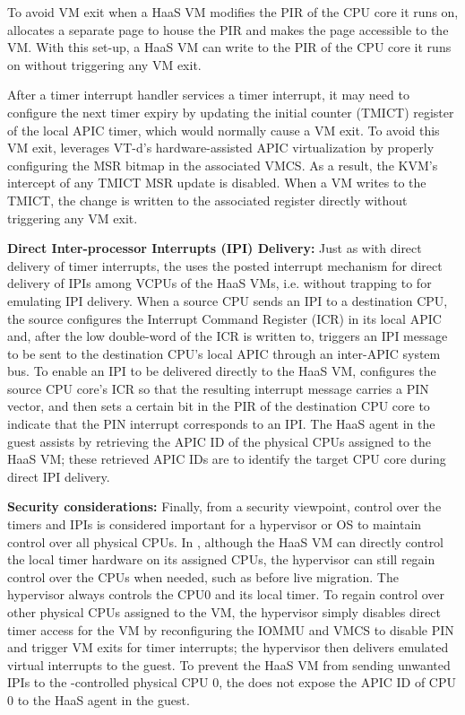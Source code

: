 To avoid VM exit when a HaaS VM modifies the PIR of the CPU core it runs on,
\na allocates a separate page to house the PIR and makes the page accessible to the VM.
With this set-up, a HaaS VM can write to the PIR of the CPU core it runs on without triggering any VM exit.

After a timer interrupt handler services a timer interrupt, it may need to configure the next timer expiry by updating the initial counter (TMICT) register of the local APIC timer,
which would normally cause a VM exit. To avoid this VM exit, \na leverages VT-d's hardware-assisted APIC virtualization by properly configuring the MSR bitmap in the associated VMCS.
As a result, the KVM's  intercept of any TMICT MSR update is disabled. When a VM writes to the TMICT, the change is written to the associated register directly without triggering any VM exit.

{\bf Direct Inter-processor Interrupts (IPI) Delivery:}
Just as with direct delivery of timer interrupts, the \na uses the posted interrupt mechanism 
for direct delivery of IPIs among VCPUs of the HaaS VMs, i.e. without trapping to \na 
for emulating IPI delivery.
When a source CPU sends an IPI to a destination CPU, 
the source configures the Interrupt Command Register (ICR) in its local APIC
and, after the low double-word of the ICR is written to, triggers an IPI message 
to be sent to the destination CPU's local APIC through an inter-APIC system bus.
To enable an IPI to be delivered directly to the HaaS VM, \na 
configures the source CPU core's ICR so that the resulting 
interrupt message carries a PIN vector,
and then sets a certain bit in the PIR of the destination CPU core 
to indicate that the PIN interrupt corresponds to an IPI.
The HaaS agent in the guest assists by retrieving the APIC ID of 
the physical CPUs assigned to the HaaS VM; these retrieved APIC IDs are 
to identify the target CPU core during direct IPI delivery.

{\bf Security considerations:}
Finally, from a security viewpoint, control over the timers and IPIs 
is considered important for a hypervisor or OS to maintain control 
over all physical CPUs.
In \na, although the HaaS VM can directly control the local timer hardware on 
its assigned CPUs, the hypervisor can still regain
control over the CPUs when needed, such as before live migration.
The hypervisor always controls the CPU0 and its local timer.
To regain control over other physical CPUs assigned to the VM, the hypervisor
simply disables direct timer access for the VM by reconfiguring the IOMMU and VMCS to
disable PIN and trigger VM exits for timer interrupts; the hypervisor then delivers
emulated virtual interrupts to the guest.
To prevent the HaaS VM from sending unwanted IPIs to the \sna-controlled physical CPU 0,
the \na does not expose the APIC ID of CPU 0 to the HaaS agent in the guest.

